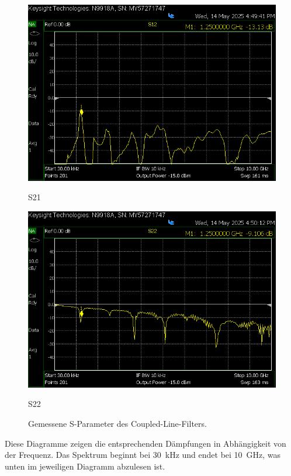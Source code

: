 \begin{figure}[H]
        \vspace{0.5cm}

        \begin{minipage}{0.45\textwidth}
            \centering
            \includegraphics[width=\linewidth]{Pictures/S12neuCooleGrupp.png}
            \caption*{S21}
        \end{minipage}
        \hfill
        \begin{minipage}{0.45\textwidth}
            \centering
            \includegraphics[width=\linewidth]{Pictures/S22neuCooleGruppe.png}
            \caption*{S22}
        \end{minipage}    
        \caption{Gemessene S-Parameter des Coupled-Line-Filters.}
        \label{fig:fieldfox_s_parameter}
    \end{figure}
    Diese Diagramme zeigen die entsprechenden Dämpfungen in Abhängigkeit von der Frequenz. Das Spektrum beginnt bei 30~kHz und endet bei 10~GHz, was unten im jeweiligen Diagramm abzulesen ist. 
    
